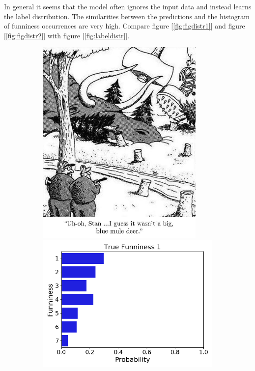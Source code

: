 \documentclass[draft,final,oneside]{vutinfth} %
\begin{document}
In general it seems that the model often ignores the input data and instead learns the label distribution. The similarities between the predictions and the histogram of funniness occurrences are very high. Compare figure [\ref{fig:figdistr1}] and figure [\ref{fig:figdistr2}] with figure [\ref{fig:labeldistr}].

\begin{figure}
\centering

\begin{subfigure}[b]{0.45\textwidth}
\centering
\includegraphics[width=0.9\textwidth,height=0.3\textheight,keepaspectratio]{graphics/detail/Test_for_Image_1_cartoon} \\
\includegraphics[width=1.0\textwidth]{graphics/detail/Test_for_Image_1}

\end{subfigure}
\end{figure}
\end{document}
